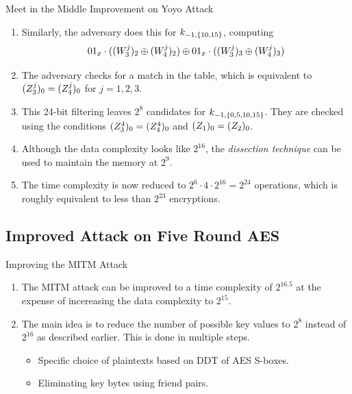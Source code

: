 \documentclass[notheorems]{beamer}
\theoremstyle{definition}
\theoremstyle{example}
\begin{document}
    \begin{frame}[<+->]{Meet in the Middle Improvement on Yoyo Attack}
        \begin{enumerate}
            \conti
            \item Similarly, the adversary does this for \(k_{-1, \{10,
            15\}}\), computing
            \begin{equation}
                01_x \cdot ((W_3^j)_2 \oplus (W_4^j)_2) \oplus 01_x \cdot ((W_3^j)_3 \oplus (W_4^j)_3)
                \label{eq:mitm-10-15}
            \end{equation}
            \item The adversary checks for a match in the table, which is
            equivalent to \((Z_3^j)_0 = (Z_4^j)_0\) for \(j = 1, 2,
            3\).
            \item This 24-bit filtering leaves \(2^8\) candidates for \(k_{-1,
            \{0,5,10,15\}}\). They are checked using the conditions
            \((Z_3^4)_0 = (Z_4^4)_0\) and \((Z_1)_0 =
            (Z_2)_0\).
            \item Although the data complexity looks like \(2^{16}\), the
            \emph{dissection technique} can be used to maintain the memory at
            \(2^9\).
            \item The time complexity is now reduced to \(2^6 \cdot 4 \cdot
            2^{16} = 2^{24}\) operations, which is roughly equivalent to less
            than \(2^{23}\) encryptions.
        \end{enumerate} 
    \end{frame}

    \subsection{Improved Attack on Five Round AES}
    \label{subsec:improved-mitm}

    \begin{frame}[<+->]{Improving the MITM Attack}
        \begin{enumerate}
            \item The MITM attack can be improved to a time complexity of
            \(2^{16.5}\) at the expense of incereasing the data complexity to
            \(2^{15}\).
            \item The main idea is to reduce the number of possible key values
            to \(2^8\) instead of \(2^{16}\) as described earlier. This is done
            in multiple steps.
            \begin{itemize}
                \item Specific choice of plaintexts based on DDT of AES S-boxes.
                \item Eliminating key bytes using friend pairs.
            \end{itemize}
        \end{enumerate}
    \end{frame}
\end{document}
